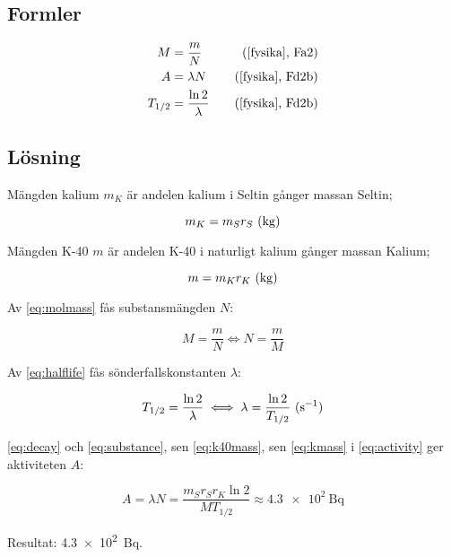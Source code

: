\subsection{Formler}

\begin{align}
    M       &= \frac{m}{N}           &\quad \text{(\cite{fysika}, Fa2)}  \label{eq:molmass} \\
    A       &= \lambda N             &\quad \text{(\cite{fysika}, Fd2b)} \label{eq:activity}  \\
    T_{1/2} &= \frac{\ln 2}{\lambda} &\quad \text{(\cite{fysika}, Fd2b)} \label{eq:halflife}
\end{align}

\subsection{Lösning}

Mängden kalium $m_K$ är andelen kalium i Seltin gånger massan Seltin;

\begin{equation}
    m_K = m_S r_S~\text{(\unit{\kg})} \label{eq:kmass}
\end{equation}

Mängden K-40 $m$ är andelen K-40 i naturligt kalium gånger massan Kalium;

\begin{equation}
    m = m_K r_K~\text{(\unit{\kg})} \label{eq:k40mass}
\end{equation}

Av \eqref{eq:molmass} fås substansmängden $N$:

\begin{equation}
    M = \frac{m}{N} \iff N = \frac{m}{M} \label{eq:substance}
\end{equation}

Av \eqref{eq:halflife} fås sönderfallskonstanten $\lambda$:

\begin{equation}
    T_{1/2} = \frac{\ln 2}{\lambda} \iff \lambda = \frac{\ln 2}{T_{1/2}}~\text{(\unit{\per\s})} \label{eq:decay}
\end{equation}

\eqref{eq:decay} och \eqref{eq:substance}, sen \eqref{eq:k40mass}, sen
\eqref{eq:kmass} i \eqref{eq:activity} ger aktiviteten $A$:

\begin{equation}
    A = \lambda N = \frac{m_S r_S r_K \ln 2}{M T_{1/2}} \approx \qty{4.3e2}{\becquerel}
\end{equation}

Resultat: \qty{4.3e2}{\becquerel}.
